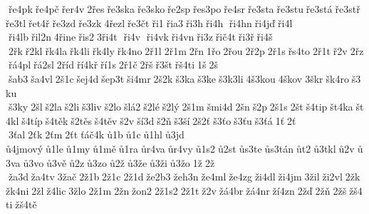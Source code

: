  ře4pk ře4pč řer4v 2řes ře3ska ře3sko ře2sp řes3po ře4sr ře3sta ře3stu ře3stá ře3stř ře3tl řet4ř ře3zd ře3zk 4řezl ře3čt ři1 řia3 ři3h ři4h  ři4hn ři4jď ři4l  ři4lb řil2n 4řine řis2 3ři4t  ři4v  ři4vk ři4vn ři3z řič4t ři3ř ři4š  2řk ř2kl řk4la řk4li řk4ly řk4no 2ř1l 2ř1m 2řn 1řo 2řou 2ř2p 2ř1s řs4to 2ř1t ř2v 2řz řá4pl řá2sl 2říd ří4kř ří1s 2ř1č 2řš ř3št řš4ti 1š 2š  šab3 ša4vl 2š1c šej4d šep3t ši4mr 2š2k š3ka š3ke š3k3li 4š3kou 4škov 3škr šk4ro š3ku  š3ky 2šl š2la š2li š3liv š2lo šlá2 š2lé š2lý 2š1m šmi4d 2šn š2p 2š1s 2št š4tip št4ka št4kl š4típ š4těk š2těs š4těv š2v ší3d š2ň š3ší 2š2ť š3ťo š3ťu š3ťá 1ť 2ť  3ťal 2ťk 2ťm 2ťt ťáč4k ů1b ů1c ů1hl ů3jd 	ů4jmový ů1le ů1my ů1mě ů1ra ůr4va ůr4vy ů1s2 ů2st ůs3te ůs3tán ůt2 ů3tkl ů2v ů3va ů3vo ů3vě ů2z ů3zo ů2ž ů3že ů3ži ů3žo 1ž 2ž  ža3d ža4tv 3žač 2ž1b 2ž1c 2ž1d že2b3 žeh3n že4ml že4zg ži4dl ži4jm 3žil ži2vl 2žk žk4ni 2žl ž4lic 3žlo 2ž1m 2žn žon2 2ž1s2 2ž1t ž2v žá4br žá4nr ží4zn 2žď 2žň 2žš žš4ti žš4tě